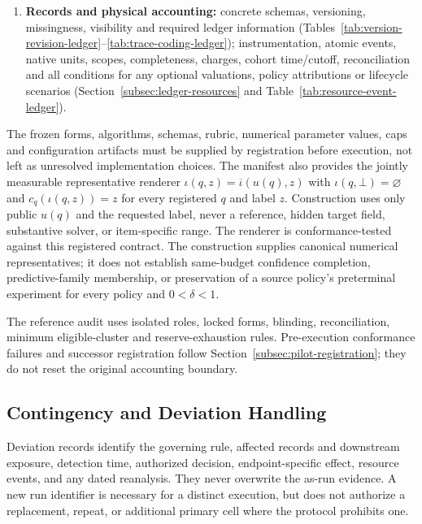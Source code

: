 \documentclass[10pt]{article} %
\providecommand{\1}{\mathbf{1}}  %
\theoremstyle{remark}
\theoremstyle{definition}
\begin{document}
\begin{enumerate}[leftmargin=*,itemsep=3pt,topsep=3pt]
unresolved/paired ranges, mandatory pessimistic eligible planned-cell numerical
summary, any full-solution completion range and outcome-blind relevance mapping
(Section~\ref{subsec:pilot-outcomes}); finite deviation map and consistency
checks (Sections~\ref{subsec:ledger-deviations}
and~\ref{subsec:ledger-consistency}); inferential limits
(Section~\ref{subsec:pilot-scope}).
\item \textbf{Records and physical accounting:}
concrete schemas, versioning, missingness, visibility and required ledger
information (Tables~\ref{tab:version-revision-ledger}--\ref{tab:trace-coding-ledger});
instrumentation, atomic events, native units, scopes, completeness, charges,
cohort time/cutoff, reconciliation and all conditions for any optional
valuations, policy attributions or lifecycle scenarios
(Section~\ref{subsec:ledger-resources} and Table~\ref{tab:resource-event-ledger}).
\end{enumerate}
The frozen forms, algorithms, schemas, rubric, numerical parameter values,
caps and configuration artifacts must be supplied by registration before
execution, not left as unresolved implementation choices.
The manifest also provides the jointly measurable representative
renderer $\iota(q,z)=\overline\iota(u(q),z)$ with
$\iota(q,\bot)=\varnothing$ and
$c_q(\iota(q,z))=z$ for every registered $q$ and label $z$.
Construction uses only public $u(q)$ and the requested label, never a
reference, hidden target field, substantive solver, or item-specific range.
The renderer is conformance-tested against this registered contract.
The construction supplies canonical numerical representatives; it does
not establish same-budget confidence completion, predictive-family
membership, or preservation of a source policy's preterminal experiment
for every policy and $0<\delta<1$.

The reference audit uses isolated roles, locked forms, blinding,
reconciliation, minimum eligible-cluster and reserve-exhaustion rules.
Pre-execution conformance failures and successor registration follow
Section~\ref{subsec:pilot-registration}; they do not reset the original
accounting boundary.

\subsection{Contingency and Deviation Handling}
\label{subsec:ledger-deviations}

Deviation records identify the governing rule, affected records and
downstream exposure, detection time, authorized decision, endpoint-specific
effect, resource events, and any dated reanalysis. They never overwrite
the as-run evidence. A new run identifier is necessary for a distinct
execution, but does not authorize a replacement, repeat, or additional
primary cell where the protocol prohibits one.
\end{document}
